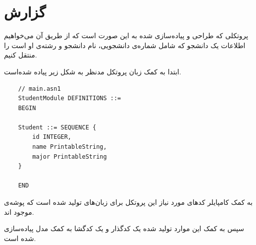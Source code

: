 \chapter{گزارش}
پروتکلی که طراحی و پیاده‌سازی شده به این صورت است که از طریق آن می‌خواهیم اطلاعات یک دانشجو که شامل شماره‌ی دانشجویی، نام دانشجو و رشته‌ی او است را منتقل کنیم.

ابتدا به کمک زبان 
پروتکل مدنظر به شکل زیر پیاده شده‌است.

\begin{lstlisting}
	// main.asn1
	StudentModule DEFINITIONS ::=
	BEGIN
	
	Student ::= SEQUENCE {
		id INTEGER,
		name PrintableString,
		major PrintableString
	}
	
	END
\end{lstlisting}

به کمک کامپایلر 
کدهای مورد نیاز این پروتکل برای زبان‌های
تولید شده است که پوشه‌ی 
موجود اند.

سپس به کمک این موارد تولید شده یک کدگذار و یک کدگشا به کمک مدل
پیاده‌سازی شده است.


